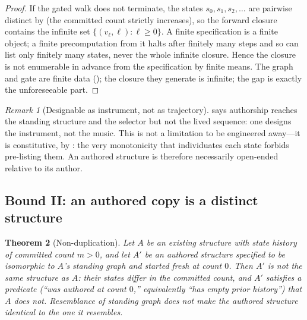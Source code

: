 \documentclass[11pt,a4paper]{article}
\theoremstyle{thmstyle}
\newtheorem{theorem}{Theorem}[section]
\theoremstyle{definition}
\theoremstyle{remark}
\newtheorem{remark}[theorem]{Remark}
\newcommand{\Agent}{A}                    %
\begin{document}
\begin{proof}
If the gated walk does not terminate, the states $s_0,s_1,s_2,\dots$ are pairwise
distinct by  (the committed count strictly increases), so the
forward closure contains the infinite set $\{(v_\ell,\ell):\ell\ge0\}$. A finite
specification is a finite object; a finite precomputation from it halts after
finitely many steps and so can list only finitely many states, never the whole
infinite closure. Hence the closure is not enumerable in advance from the
specification by finite means. The graph and gate are finite data
(); the closure they generate is infinite; the gap is exactly the
unforeseeable part.
\end{proof}

\begin{remark}[Designable as instrument, not as trajectory]
\label{rem:instrument}
 says authorship reaches the standing structure and the selector
but not the lived sequence: one designs the instrument, not the music. This is
not a limitation to be engineered away---it is constitutive, by
: the very monotonicity that individuates each state forbids
pre-listing them. An authored structure is therefore necessarily open-ended
relative to its author.
\end{remark}

\subsection{Bound II: an authored copy is a distinct structure}

\begin{theorem}[Non-duplication]
\label{thm:nondup}
Let $\Agent$ be an existing structure with state history of committed count $m>0$,
and let $\Agent'$ be an authored structure specified to be isomorphic to
$\Agent$'s standing graph and started fresh at count $0$. Then $\Agent'$ is not
the same structure as $\Agent$: their states differ in the committed count, and
$\Agent'$ satisfies a predicate \textup{(}``was authored at count $0$,'' equivalently
``has empty prior history''\textup{)} that $\Agent$ does not. Resemblance of
standing graph does not make the authored structure identical to the one it
resembles.
\end{theorem}
\end{document}
